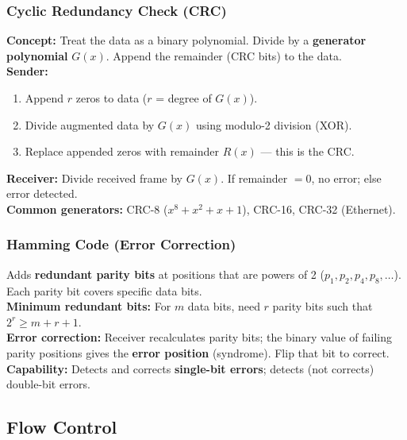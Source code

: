 \documentclass[12pt,a4paper]{article}
\begin{document}
\subsubsection*{Cyclic Redundancy Check (CRC)}
\begin{tcolorbox}[formulabox, title={\textbf{CRC --- Most Widely Used Error Detection}}]
\textbf{Concept:} Treat the data as a binary polynomial. Divide by a \textbf{generator polynomial} $G(x)$. Append the remainder (CRC bits) to the data.\\[4pt]
\textbf{Sender:}
\begin{enumerate}[label=\arabic*., leftmargin=*, itemsep=2pt, topsep=0pt]
  \item Append $r$ zeros to data ($r$ = degree of $G(x)$).
  \item Divide augmented data by $G(x)$ using modulo-2 division (XOR).
  \item Replace appended zeros with remainder $R(x)$ --- this is the CRC.
\end{enumerate}
\textbf{Receiver:} Divide received frame by $G(x)$. If remainder $= 0$, no error; else error detected.\\[4pt]
\textbf{Common generators:} CRC-8 ($x^8+x^2+x+1$), CRC-16, CRC-32 (Ethernet).
\end{tcolorbox}

\subsubsection*{Hamming Code (Error Correction)}
\begin{tcolorbox}[formulabox, title={\textbf{Hamming Code}}]
Adds \textbf{redundant parity bits} at positions that are powers of 2 ($p_1, p_2, p_4, p_8, \ldots$). Each parity bit covers specific data bits.\\[4pt]
\textbf{Minimum redundant bits:} For $m$ data bits, need $r$ parity bits such that $2^r \geq m + r + 1$.\\[4pt]
\textbf{Error correction:} Receiver recalculates parity bits; the binary value of failing parity positions gives the \textbf{error position} (syndrome). Flip that bit to correct.\\
\textbf{Capability:} Detects and corrects \textbf{single-bit errors}; detects (not corrects) double-bit errors.
\end{tcolorbox}

\subsection{Flow Control}
\end{document}

